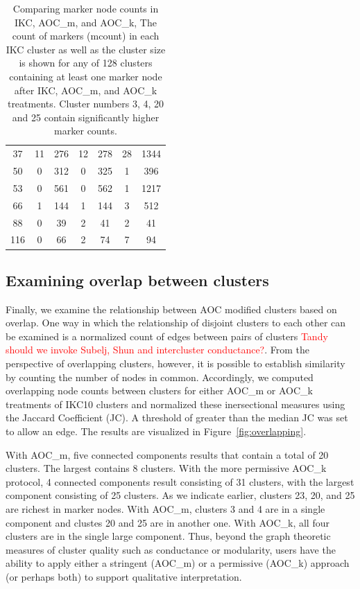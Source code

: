 \documentclass[12pt, oneside]{article}   	%
\begin{document}
\begin{table}[!ht]
{\begin{tabular}{ccccccc}
37 &  11 & 276 &  12 & 278 &  28 & 1344 \\ 
50 &   0 & 312 &   0 & 325 &   1 & 396 \\ 
53 &   0 & 561 &   0 & 562 &   1 & 1217 \\ 
66 &   1 & 144 &   1 & 144 &   3 & 512 \\ 
88 &   0 &  39 &   2 &  41 &   2 &  41 \\ 
116 &   0 &  66 &   2 &  74 &   7 &  94 \\ 
   \hline
\end{tabular}}
\captionsetup{width=0.9\textwidth}
\caption{Comparing marker node counts in IKC, AOC\_m, and AOC\_k, The count of markers (mcount) in each IKC cluster as well as the cluster size is shown for any of 128 clusters containing at least one marker node after IKC,  AOC\_m, and AOC\_k treatments. Cluster numbers 3, 4, 20 and 25 contain significantly higher marker counts.}
\label{tab:marker-node-table}
\end{table}

\subsection{Examining overlap between clusters}
Finally, we examine the relationship between AOC modified clusters based on overlap. One way in which the relationship of disjoint clusters to each other can be examined is a normalized count of edges between pairs of clusters \textcolor{red}{Tandy should we invoke Subelj, Shun and intercluster conductance?}. From the perspective of overlapping clusters, however, it is possible to establish similarity by counting the number of nodes in common. Accordingly, we computed overlapping node counts between clusters for either AOC\_m or AOC\_k treatments of IKC10 clusters and normalized these inersectional measures using the Jaccard Coefficient (JC). A threshold of greater than  the median JC was set to allow an edge. The results are visualized in Figure~\ref{fig:overlapping}.

With AOC\_m, five connected components results that contain a total of 20 clusters. The largest contains 8 clusters. With the more permissive AOC\_k protocol, 4 connected components result consisting of 31 clusters, with the largest component consisting of 25 clusters. As we indicate earlier, clusters 23, 20, and 25 are richest in marker nodes. With AOC\_m, clusters 3 and 4 are in a single component and clustes 20 and 25 are in another one. With AOC\_k, all four clusters are in the single large component. Thus, beyond the graph theoretic measures of cluster quality such as conductance or modularity, users have the ability to apply either a stringent (AOC\_m) or a permissive (AOC\_k) approach (or perhaps both) to support qualitative interpretation.
\end{document}
